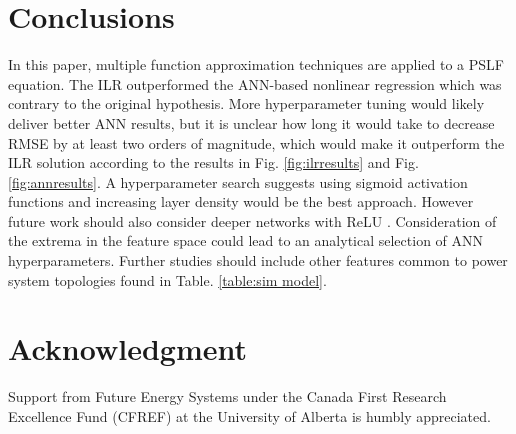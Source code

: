 \documentclass[conference]{IEEEtran}
\begin{document}
\section{Conclusions}
\label{sec:conc}
In this paper, multiple function approximation techniques are applied to a PSLF equation. The ILR outperformed the ANN-based nonlinear regression which was contrary to the original hypothesis. More hyperparameter tuning would likely deliver better ANN results, but it is unclear how long it would take to decrease RMSE by at least two orders of magnitude, which would make it outperform the ILR solution according to the results in Fig. \ref{fig:ilrresults} and Fig. \ref{fig:annresults}. A hyperparameter search suggests using sigmoid activation functions and increasing layer density would be the best approach. However future work should also consider deeper networks with ReLU \cite{hieb2017}. Consideration of the extrema in the feature space could lead to an analytical selection of ANN hyperparameters. Further studies should include other features common to power system topologies found in Table. \ref{table:sim model}.

\section*{Acknowledgment}
Support from Future Energy Systems under the Canada First Research Excellence Fund (CFREF) at the University of Alberta is humbly appreciated.




\end{document}
